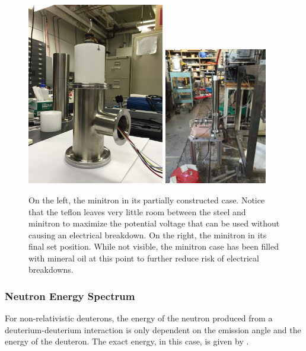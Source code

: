 \begin{figure}[t]
	\centering
	\includegraphics[width=0.533\textwidth]{nerix_minitron_partial_case}
	\includegraphics[width=0.4\textwidth]{nerix_minitron_set}
	\caption{On the left, the minitron in its partially constructed case.  Notice that the teflon leaves very little room between the steel and minitron to maximize the potential voltage that can be used without causing an electrical breakdown.  On the right, the minitron in its final set position.  While not visible, the minitron case has been filled with mineral oil at this point to further reduce risk of electrical breakdowns.}
	\label{fig:nerix_minitron_rate}
\end{figure}


\subsubsection{Neutron Energy Spectrum}

For non-relativistic deuterons,  the energy of the neutron produced from a deuterium-deuterium interaction is only dependent on the emission angle and the energy of the deuteron.  The exact energy, in this case, is given by  \cite{csikai1987crc}. 


